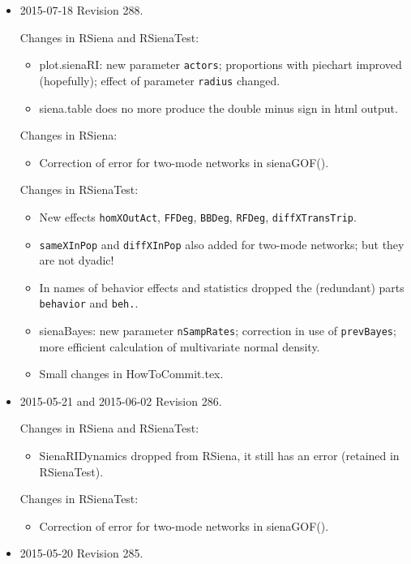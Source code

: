 \documentclass[a4paper,fleqn,11pt]{article}
\newcommand{\+}{\, + \,}
\newcommand{\sfn}[1]{\textsf{#1}}
\newcommand{\rs}{{\sf RSiena}}
\newcommand{\rst}{{\sf RSienaTest}}
\begin{document}
\begin{small}
\begin{itemize}
\item 2015-07-18 Revision 288.

Changes in RSiena and RSienaTest:
\begin{itemize}
   \item \sfn{plot.sienaRI}: new parameter \texttt{actors}; proportions with
     piechart improved (hopefully); effect of parameter \texttt{radius} changed.
   \item \sfn{siena.table} does no more produce the double minus sign in html output.
\end{itemize}

Changes in RSiena:
\begin{itemize}
\item Correction of error for two-mode networks in \sfn{sienaGOF()}.
\end{itemize}

Changes in RSienaTest:
\begin{itemize}
\item New effects \texttt{homXOutAct}, \texttt{FFDeg}, \texttt{BBDeg},
   \texttt{RFDeg}, \texttt{diffXTransTrip}.
   \item \texttt{sameXInPop} and \texttt{diffXInPop} also added for two-mode networks;
     but they are not dyadic!
   \item In names of behavior effects and statistics dropped the
     (redundant) parts \texttt{behavior} and \texttt{beh.}.
   \item \sfn{sienaBayes}: new parameter \texttt{nSampRates};
     correction in use of \texttt{prevBayes};
	 more efficient calculation of multivariate normal density.
   \item Small changes in \sfn{HowToCommit.tex}.
\end{itemize}

\item 2015-05-21 and 2015-06-02 Revision 286.

Changes in RSiena and RSienaTest:
\begin{itemize}
\item \sfn{SienaRIDynamics} dropped from \rs, it still has an error
      (retained in \rst).
\end{itemize}

Changes in RSienaTest:
\begin{itemize}
\item Correction of error for two-mode networks in \sfn{sienaGOF()}.
\end{itemize}

\item 2015-05-20 Revision 285.


\end{itemize}
\end{small}
\end{document}
